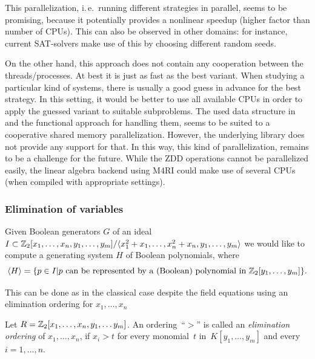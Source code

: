 This parallelization, i.\,e.\ running different strategies in parallel, seems to be
promising, because it potentially provides a 
nonlinear speedup (higher factor than number of CPUs). This
can also be observed in other domains: for instance, current SAT-solvers 
make use of this by choosing different random seeds.

On the other hand, this approach does not contain any cooperation between the
threads/processes. At best it is just as fast as the best variant. When studying
a particular kind of systems, there is usually a good guess in advance for the
best strategy. In this setting, it would be better to use all available CPUs in
order to apply the guessed variant to suitable subproblems.
The used data structure in \PolyBoRi and the functional approach for handling
them, 
seems to be suited to a cooperative shared memory parallelization. However,
the underlying library \CUDD does not provide any support for that. In this way,
this kind of parallelization, remains to be a challenge for the future.
While the ZDD operations cannot be parallelized easily, the linear algebra
backend using M4RI could make use of several CPUs (when compiled with
appropriate settings). 

\subsubsection{Elimination of variables}

Given Boolean generators $G$ of an ideal $I\subset \mathbb{Z}_2[x_1,\ldots,x_n,y_1,\ldots,y_m]/\langle x_1^2+x_1,\ldots,x_n^2+x_n,y_1,\ldots,y_m \rangle$
we would like to compute a generating system $H$ of Boolean polynomials, where $$\langle H\rangle=\{p\in I\vert p \mbox{ can be represented by a (Boolean) polynomial in } \mathbb{Z}_2[y_1,\ldots,y_m]\}.$$

This can be done as in the classical case despite the field equations using an elimination ordering for $x_1, \ldots, x_n$

\begin{definition}
  Let $R=\mathbb{Z}_2[x_1,\ldots, x_n, y_1, \ldots y_m]$. An ordering~``$>$'' is called an \emph{elimination ordering} of $x_1, \ldots, x_n$, if $x_i>t$ 
  for every monomial~$t$ in~$K[y_1, \ldots, y_m]$ and every $i=1,\ldots,n$. 
\end{definition}
